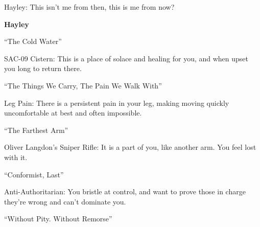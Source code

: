 
Hayley: This isn't me from then, this is me from now?\\[4mm]








\textbf{Hayley}



 ``The Cold Water''

 SAC-09 Cistern: This is a place of solace and healing for you, and when upset you long to return there.



 ``The Things We Carry, The Pain We Walk With''

 Leg Pain: There is a persistent pain in your leg, making moving quickly uncomfortable at best and often impossible.



 ``The Farthest Arm''

 Oliver Langdon's Sniper Rifle: It is a part of you, like another arm. You feel lost with it.





 ``Conformist, Last''

 Anti-Authoritarian: You bristle at control, and want to prove those in charge they're wrong and can't dominate you.



 ``Without Pity. Without Remorse''


